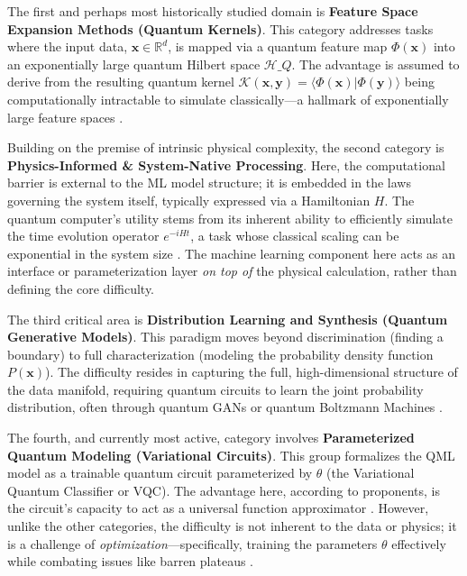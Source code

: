 \documentclass{article}
\begin{document}
The first and perhaps most historically studied domain is \textbf{Feature Space Expansion Methods (Quantum Kernels)}. This category addresses tasks where the input data, $\mathbf{x} \in \mathbb{R}^d$, is mapped via a quantum feature map $\Phi(\mathbf{x})$ into an exponentially large quantum Hilbert space $\mathcal{H}\_Q$. The advantage is assumed to derive from the resulting quantum kernel $\mathcal{K}(\mathbf{x}, \mathbf{y}) = \langle \Phi(\mathbf{x}) | \Phi(\mathbf{y}) \rangle$ being computationally intractable to simulate classically---a hallmark of exponentially large feature spaces \cite{jager2023universal}.

Building on the premise of intrinsic physical complexity, the second category is \textbf{Physics-Informed \& System-Native Processing}. Here, the computational barrier is external to the ML model structure; it is embedded in the laws governing the system itself, typically expressed via a Hamiltonian $H$. The quantum computer's utility stems from its inherent ability to efficiently simulate the time evolution operator $e^{-iHt}$, a task whose classical scaling can be exponential in the system size \cite{altman2021quantum}. The machine learning component here acts as an interface or parameterization layer \textit{on top of} the physical calculation, rather than defining the core difficulty.

The third critical area is \textbf{Distribution Learning and Synthesis (Quantum Generative Models)}. This paradigm moves beyond discrimination (finding a boundary) to full characterization (modeling the probability density function $P(\mathbf{x})$). The difficulty resides in capturing the full, high-dimensional structure of the data manifold, requiring quantum circuits to learn the joint probability distribution, often through quantum GANs or quantum Boltzmann Machines \cite{zhu2022generative}.

The fourth, and currently most active, category involves \textbf{Parameterized Quantum Modeling (Variational Circuits)}. This group formalizes the QML model as a trainable quantum circuit parameterized by $\theta$ (the Variational Quantum Classifier or VQC). The advantage here, according to proponents, is the circuit's capacity to act as a universal function approximator \cite{goto2021universal}. However, unlike the other categories, the difficulty is not inherent to the data or physics; it is a challenge of \textit{optimization}---specifically, training the parameters $\theta$ effectively while combating issues like barren plateaus \cite{cerezo2021cost}.
\end{document}
